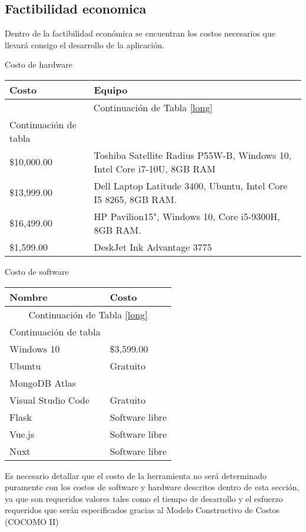 
\subsection*{Factibilidad economica}
Dentro de la factibilidad económica se encuentran los costos necesarios que llevará consigo el desarrollo de la aplicación.


Costo de hardware
\begin{longtable}{  p{2.5cm} | p{6cm} }	
	
	\hline
	
	\textbf{Costo } & \textbf{Equipo }  \\
	\hline
	\hline
	
	\endfirsthead
	
	\multicolumn{2}{c}{Continuación de Tabla \ref{long}}\\
	\hline
	Continuación de tabla\\
	\hline
	\endhead
	
	\hline
	\endfoot
		
	\$10,000.00 & Toshiba Satellite Radius P55W-B, Windows 10, Intel Core i7-10U, 8GB RAM\\
	\$13,999.00 & Dell Laptop Latitude 3400, Ubuntu, Intel Core I5 8265, 8GB RAM.\\
	\$16,499.00 & HP Pavilion15", Windows 10, Core i5-9300H, 8GB RAM.\\
	\$1,599.00 & DeskJet Ink Advantage 3775\\
	
\end{longtable}


Costo de software
\begin{longtable}{ l | l }	
	
	\hline
	
	\textbf{Nombre } & \textbf{Costo } \\
	\hline
	\hline
	
	\endfirsthead
	
	\multicolumn{2}{c}{Continuación de Tabla \ref{long}}\\
	\hline
	Continuación de tabla\\
	\hline
	\endhead
	
	\hline
	\endfoot
	
	 Windows 10 & \$3,599.00\\
	 Ubuntu & Gratuito\\
	 MongoDB Atlas & \\
	 Visual Studio Code & Gratuito\\
	 Flask & Software libre\\
	 Vue.js & Software libre\\
	 Nuxt & Software libre\\
	
\end{longtable}


Es necesario detallar que el costo de la herramienta no será determinado puramente con los costos de software y hardware descritos dentro de esta sección, ya que son requeridos valores tales como el tiempo de desarrollo y el esfuerzo requeridos que serán especificados gracias al Modelo Constructivo de Costos (COCOMO II)


